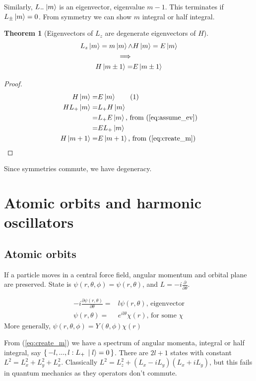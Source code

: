 \documentclass[]{article}
\newcommand\numberthis{\addtocounter{equation}{1}\tag{\theequation}}
\newtheorem{thm}{Theorem}
\begin{document}
Similarly, $L_- \ket{m}$ is an eigenvector, eigenvalue $m-1$. This terminates if  $L_{\pm} \ket{m}=0$. From symmetry we can show $m$ integral or half integral.

\begin{thm}[Eigenvectors of $L_z$ are degenerate eigenvectors of $H$]
	\begin{align*}
	L_z \ket{m} = m \ket{m} \land& H \ket{m} = E \ket{m}\\
	 \implies&\\
	  H \ket{m \pm 1} =& E \ket{m \pm 1}
	\end{align*}
\end{thm} 
\begin{proof}
	\begin{align*}
	H \ket{m} =& E \ket{m} \numberthis \label{eq:assume_ev}\\
	H L_+ \ket{m} =& L_+ H \ket{m}\\
	=& L_+ E \ket{m} \text{, from (\ref{eq:assume_ev})}\\
	=& E L_+  \ket{m}\\
	H \ket{m+1} =& E \ket{m+1} \text{, from (\ref{eq:create_m})}
	\end{align*}
\end{proof}

Since symmetries commute, we have degeneracy.

\section{Atomic orbits and harmonic oscillators}

\subsection{Atomic orbits}

If a particle moves in a central force field, angular momentum and orbital plane are preserved. State is $\psi(r,\theta,\phi)= \psi(r,\theta)$, and $L = -i \frac{\partial}{\partial \theta}$.

\begin{align*}
-i \frac{\partial \psi(r,\theta)}{\partial \theta} =& l \psi(r,\theta) \text{, eigenvector}\\
\psi(r,\theta) =& e^{i l \theta} \chi(r) \text{, for some $\chi$}
\end{align*}
More generally, $\psi(r,\theta,\phi)= Y(\theta,\phi) \chi(r)$


From (\ref{eq:create_m}) we have a spectrum of angular momenta, integral or half integral, say $\set{-l,...,l:L_+\ket{l}=0}$. There are $2l+1$ states with constant $L^2 = L_x^2 + L_y^2 + L_x^2$. Classically $L^2 = L_z^2 +(L_x-iL_y)(L_x+iL_y)$, but this fails in quantum mechanics as they operators don't commute.
\end{document}

